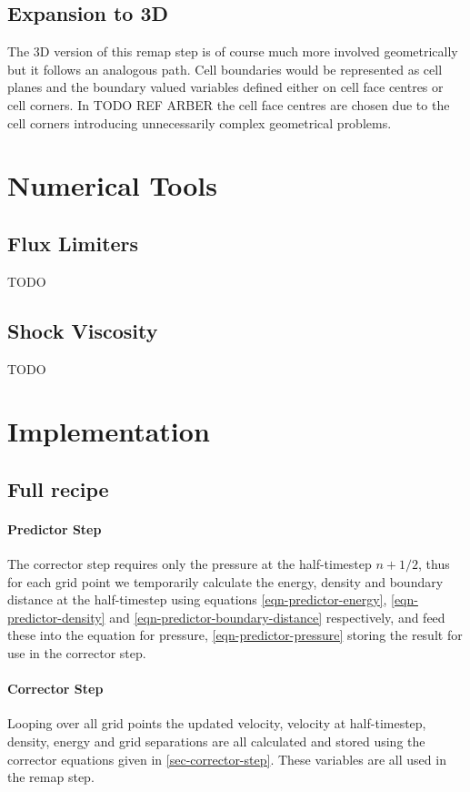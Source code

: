 \subsection{Expansion to 3D}
The 3D version of this remap step is of course much more involved geometrically but it follows an analogous path. Cell boundaries would be represented as cell planes and the boundary valued variables defined either on cell face centres or cell corners. In TODO REF ARBER the cell face centres are chosen due to the cell corners introducing unnecessarily complex geometrical problems.


\section{Numerical Tools}
\subsection{Flux Limiters}
\label{sec-flux-limiters}

TODO
\subsection{Shock Viscosity}
TODO

\section{Implementation}
\subsection{Full recipe}
\paragraph{Predictor Step}
The corrector step requires only the pressure at the half-timestep $n+1/2$, thus for each grid point we temporarily calculate the energy, density and boundary distance at the half-timestep using equations \eqref{eqn-predictor-energy}, \eqref{eqn-predictor-density} and \eqref{eqn-predictor-boundary-distance} respectively, and feed these into the equation for pressure, \eqref{eqn-predictor-pressure} storing the result for use in the corrector step.

\paragraph{Corrector Step}
Looping over all grid points the updated velocity, velocity at half-timestep, density, energy and grid separations are all calculated and stored using the corrector equations given in \ref{sec-corrector-step}. These variables are all used in the remap step.

